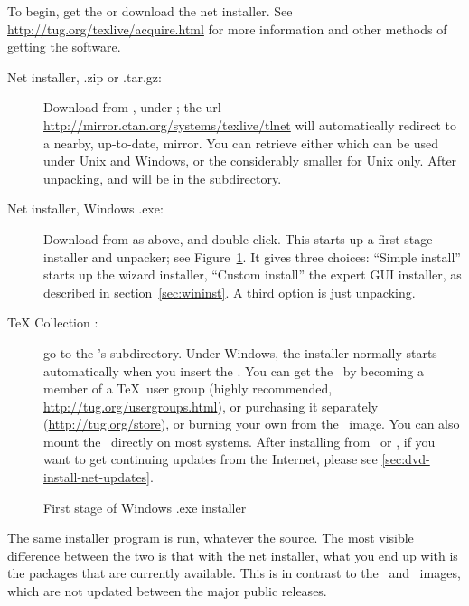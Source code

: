 \documentclass{article}
\begin{document}
To begin, get the \TK{} \DVD{} or download the \TL{} net installer.  See
\url{http://tug.org/texlive/acquire.html} for more information and other
methods of getting the software.

\begin{description}
\item [Net installer, .zip or .tar.gz:] Download from \CTAN, under
; the url
\url{http://mirror.ctan.org/systems/texlive/tlnet} will automatically
redirect to a nearby, up-to-date, mirror.  You can retrieve either
 which can be used under Unix and Windows, or
the considerably smaller  for Unix
only. After unpacking,  and
 will be in the 
subdirectory.

\item[Net installer, Windows .exe:] Download from \CTAN{} as above,
and double-click. This starts up a first-stage installer and unpacker;
see Figure~\ref{fig:nsis}. It gives three choices: ``Simple install''
starts up the wizard installer, ``Custom install'' the expert GUI
installer, as described in section~\ref{sec:wininst}. A third option is
just unpacking.

\item [\TeX{} Collection \DVD:] go to the \DVD's 
subdirectory. Under Windows, the installer normally starts automatically
when you insert the \DVD.  You can get the \DVD\ by becoming a member of
a \TeX\ user group (highly recommended,
\url{http://tug.org/usergroups.html}), or purchasing it separately
(\url{http://tug.org/store}), or burning your own from the \ISO\ image.
You can also mount the \ISO\ directly on most systems.  After installing
from \DVD\ or \ISO, if you want to get continuing updates from the
Internet, please see \ref{sec:dvd-install-net-updates}.

\end{description}

\begin{figure}[tb]
\caption{First stage of Windows .exe installer}\label{fig:nsis}
\end{figure}

The same installer program is run, whatever the source.  The most
visible difference between the two is that with the net installer, what
you end up with is the packages that are currently available.  This is
in contrast to the \DVD\ and \ISO\ images, which are not updated between
the major public releases.
\end{document}
